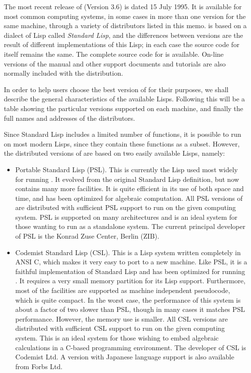 The most recent release of {\REDUCE} (Version 3.6) is dated 15 July 1995.
It is available for most common computing systems, in some cases in more
than one version for the same machine, through a variety of distributors
listed in this memo. {\REDUCE} is based on a dialect of Lisp called {\em
Standard Lisp}, and the differences between versions are the result of
different implementations of this Lisp; in each case the source code for
{\REDUCE} itself remains the same.  The complete source code for {\REDUCE}
is available.  On-line versions of the manual and other support documents
and tutorials are also normally included with the distribution.

In order to help users choose the best version of {\REDUCE} for their
purposes, we shall describe the general characteristics of the available
Lisps.  Following this will be a table showing the particular versions
supported on each machine, and finally the full names and addresses of the
{\REDUCE} distributors.

Since Standard Lisp includes a limited number of functions, it is possible
to run {\REDUCE} on most modern Lisps, since they contain these functions as
a subset.  However, the distributed versions of {\REDUCE} are based on two
easily available Lisps, namely:
\begin{itemize}
\item Portable Standard Lisp (PSL).
This is currently the Lisp used most widely for running {\REDUCE}.  It
evolved from the original Standard Lisp definition, but now contains many
more facilities.  It is quite efficient in its use of both space and time,
and has been optimized for algebraic computation.  All PSL versions of
{\REDUCE} are distributed with sufficient PSL support to run on the given
computing system.  PSL is supported on many architectures and is an ideal
system for those wanting to run {\REDUCE} as a standalone system. The 
current principal developer of PSL is the Konrad Zuse Center, Berlin (ZIB).

\item Codemist Standard Lisp (CSL).  This is a Lisp system written
completely in ANSI C, which makes it very easy to port to a new machine.
Like PSL, it is a faithful implementation of Standard Lisp and has been
optimized for running {\REDUCE}.  It requires a very small memory partition
for its Lisp support.  Furthermore, most of the {\REDUCE} facilities are
supported as machine independent pseudocode, which is quite compact.  In the
worst case, the performance of this system is about a factor of two slower
than PSL, though in many cases it matches PSL performance.  However, the
memory use is smaller.  All CSL versions are distributed with sufficient CSL
support to run on the given computing system.  This is an ideal system for
those wishing to embed algebraic calculations in a C-based programming
environment.  The developer of CSL is Codemist Ltd. A version with Japanese
language support is also available from Forbs Ltd.
\end{itemize}
